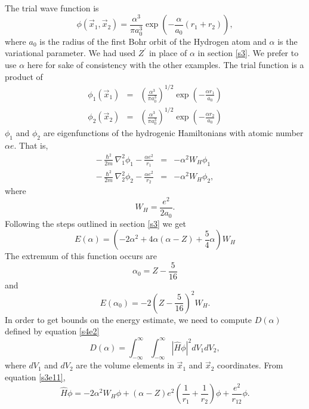 \documentclass{article}
\numberwithin{equation}{section}
\begin{document}
The trial wave function is
\begin{equation}\label{s5e49}
\phi(\vec{x}_1, \vec{x}_2) = \frac{\alpha^3}{\pi a_0^3}
\exp\left(-\frac{\alpha}{a_0}(r_1 + r_2)\right),
\end{equation}
where $a_0$ is the radius of the first Bohr orbit of the Hydrogen atom
and $\alpha$ is the variational parameter. We had used $Z^\prime$ in place
of $\alpha$ in section \ref{s3}. We prefer to use $\alpha$ here for sake
of consistency with the other examples. The trial function is a product of
\begin{eqnarray}
\phi_1(\vec{x}_1) &=& \left(\frac{\alpha^{3}}{\pi a_0^3}\right)^{1/2}
\exp\left(-\frac{\alpha r_1}{a_0}\right) \label{s5e50} \\
\phi_2(\vec{x}_2) &=& \left(\frac{\alpha^{3}}{\pi a_0^3}\right)^{1/2}
\exp\left(-\frac{\alpha r_2}{a_0}\right) \label{s5e51}
\end{eqnarray}
$\phi_1$ and $\phi_2$ are eigenfunctions of the hydrogenic Hamiltonians 
with atomic number $\alpha e$. That is,
\begin{eqnarray}
-\frac{\hslash^2}{2m}\nabla_1^2\phi_1 - \frac{\alpha e^2}{r_1} &=& 
-\alpha^2W_H\phi_1 \label{s5e52} \\
-\frac{\hslash^2}{2m}\nabla_2^2\phi_2 - \frac{\alpha e^2}{r_2} &=& 
-\alpha^2W_H\phi_2 \label{s5e53}, 
\end{eqnarray}
where 
\begin{equation}\label{s5e54}
W_H = \frac{e^2}{2a_0}.
\end{equation}
Following the steps outlined in section \ref{s3} we get
\begin{equation}\label{s5e55}
E(\alpha) = 
\left(-2\alpha^2 + 4\alpha(\alpha - Z) + \frac{5}{4}\alpha\right)W_H
\end{equation}
The extremum of this function occurs are
\begin{equation}\label{s5e56}
\alpha_0 = Z - \frac{5}{16}
\end{equation}
and
\begin{equation}\label{s5e57}
E(\alpha_0) = -2\left(Z - \frac{5}{16}\right)^2 W_H.
\end{equation}
In order to get bounds on the energy estimate, we need to compute
$D(\alpha)$ defined by equation \eqref{s4e2}
\[
D(\alpha) = \int_{-\infty}^\infty \int_{-\infty}^\infty 
|\hat{H}\phi|^2 dV_1 dV_2,
\]
where $dV_1$ and $dV_2$ are the volume elements in $\vec{x}_1$ and 
$\vec{x}_2$ coordinates. From equation \eqref{s3e11},
\[
\hat{H}\phi = -2\alpha^2W_H\phi + (\alpha - Z)e^2\left(\frac{1}{r_1}
+ \frac{1}{r_2}\right)\phi + \frac{e^2}{r_{12}}\phi.
\]
\end{document}
